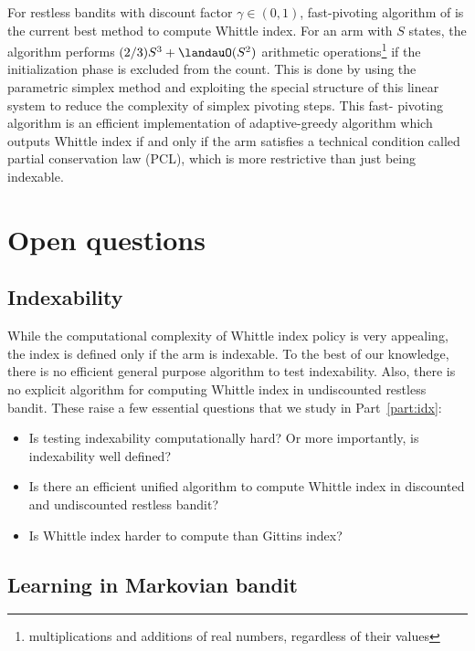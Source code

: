For restless bandits with discount factor $\gamma\in(0,1)$, fast-pivoting algorithm of \cite{nino2020fast} is the current best method to compute Whittle index.
For an arm with $S$ states, the algorithm performs $(2/3)S^3+\landauO(S^2)$ arithmetic operations\footnote{multiplications and additions of real numbers, regardless of their values} if the initialization phase is excluded from the count.
This is done by using the parametric simplex method and exploiting the special structure of this linear system to reduce the complexity of simplex pivoting steps. This fast- pivoting algorithm is an efficient implementation of adaptive-greedy algorithm \cite{nino2007dynamic} which outputs Whittle index if and only if the arm satisfies a technical condition called partial conservation law (PCL), which is more restrictive than just being indexable.


\section{Open questions}

\subsection{Indexability}

While the computational complexity of Whittle index policy is very appealing, the index is defined only if the arm is indexable.
To the best of our knowledge, there is no efficient general purpose algorithm to test indexability.
Also, there is no explicit algorithm for computing Whittle index in undiscounted restless bandit.
These raise a few essential questions that we study in Part~\ref{part:idx}:
\begin{itemize}
    \item Is testing indexability computationally hard? Or more importantly, is indexability well defined?
    \item Is there an efficient unified algorithm to compute Whittle index in discounted and undiscounted restless bandit?
    \item Is Whittle index harder to compute than Gittins index?
\end{itemize}


\subsection{Learning in Markovian bandit}

\endgroup
